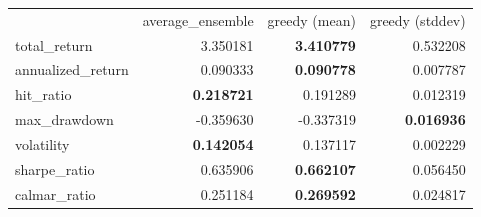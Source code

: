 \begin{tabular}{lrrr}
 & average_ensemble & greedy (mean) & greedy (stddev) \\
total_return & 3.350181 & \bfseries 3.410779 & 0.532208 \\
annualized_return & 0.090333 & \bfseries 0.090778 & 0.007787 \\
hit_ratio & \bfseries 0.218721 & 0.191289 & 0.012319 \\
max_drawdown & -0.359630 & -0.337319 & \bfseries 0.016936 \\
volatility & \bfseries 0.142054 & 0.137117 & 0.002229 \\
sharpe_ratio & 0.635906 & \bfseries 0.662107 & 0.056450 \\
calmar_ratio & 0.251184 & \bfseries 0.269592 & 0.024817 \\
\end{tabular}
